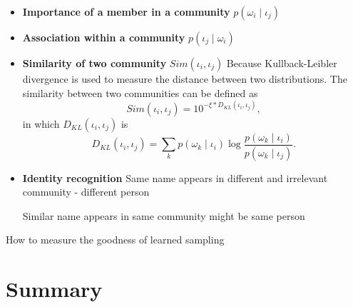 \documentclass[letterpaper]{article}
\begin{document}
\begin{itemize}
\item \textbf{Importance of a member in a community} $ p ( \omega_{i}  \mid \iota_{j} ) $ 
\item \textbf{Association within a community} $ p ( \iota_{j} \mid \omega_{i} ) $
\item \textbf{Similarity of two community} $ Sim ( \iota_{i}, \iota_{j} ) $
Because Kullback-Leibler divergence is used to measure the distance between two distributions.
The similarity between two communities can be defined as 
\begin{equation}
Sim ( \iota_{i}, \iota_{j} ) = 10^{ - \xi \ast D_{KL} ( \iota_{i}, \iota_{j} ) },
\end{equation}
in which $ D_{KL} ( \iota_{i}, \iota_{j} ) $ is
\begin{equation}
D_{KL} ( \iota_{i}, \iota_{j} ) = \sum_{k} p( \omega_{k} \mid \iota_{i} ) \log \frac{ p( \omega_{k} \mid \iota_{i} ) }{ p( \omega_{k} \mid \iota_{j} ) }.
\end{equation}
\end{itemize}

\begin{itemize}
\item \textbf{Identity recognition}
Same name appears in different and irrelevant community - different person

Similar name appears in same community might be same person
\end{itemize}


How to measure the goodness of learned sampling

\section{Summary}



\end{document}

